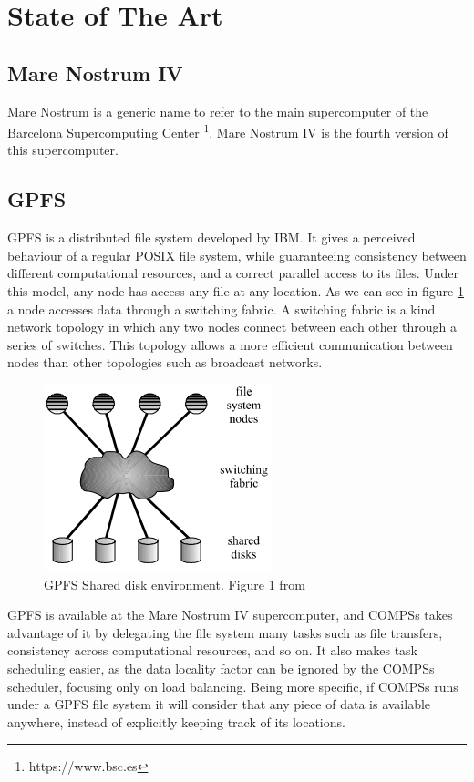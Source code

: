 \section{State of The Art}
\label{sec:state_of_the_art}

\subsection{Mare Nostrum IV}
\label{subsec:mare_nostrum}
Mare Nostrum is a generic name to refer to the main supercomputer of the Barcelona Supercomputing Center \footnote{https://www.bsc.es}. Mare Nostrum IV is the fourth version of this supercomputer. 

\subsection{GPFS}
\label{subsec:gpfs}
GPFS \cite{schmuck2002gpfs} is a distributed file system developed by IBM. It gives a perceived behaviour of a regular POSIX file system, while guaranteeing consistency between different computational resources, and a correct parallel access to its files. Under this model, any node has access any file at any location. As we can see in figure \ref{fig:gpfs_schema} a node accesses data through a switching fabric. A switching fabric is a kind network topology in which any two nodes connect between each other through a series of switches. This topology allows a more efficient communication between nodes than other topologies such as broadcast networks.
\begin{figure}
\centering
\includegraphics{figures/gpfs_schema.png}
\caption{GPFS Shared disk environment. Figure 1 from \cite{schmuck2002gpfs}}
\label{fig:gpfs_schema}
\end{figure}
GPFS is available at the Mare Nostrum IV supercomputer, and COMPSs takes advantage of it by delegating the file system many tasks such as file transfers, consistency across computational resources, and so on. It also makes task scheduling easier, as the data locality factor can be ignored by the COMPSs scheduler, focusing only on load balancing. Being more specific, if COMPSs runs under a GPFS file system it will consider that any piece of data is available anywhere, instead of explicitly keeping track of its locations.

